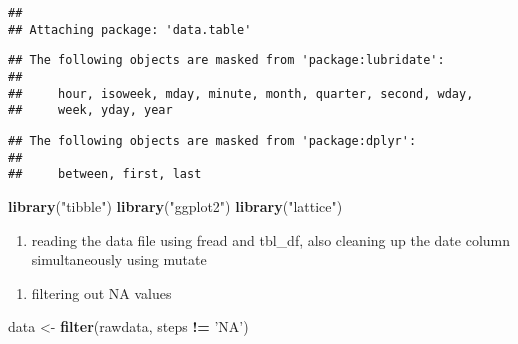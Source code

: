 \documentclass[]{article}
\newenvironment{Shaded}{\begin{snugshade}}{\end{snugshade}}
\newcommand{\KeywordTok}[1]{\textcolor[rgb]{0.13,0.29,0.53}{\textbf{#1}}}
\newcommand{\DataTypeTok}[1]{\textcolor[rgb]{0.13,0.29,0.53}{#1}}
\newcommand{\StringTok}[1]{\textcolor[rgb]{0.31,0.60,0.02}{#1}}
\newcommand{\OperatorTok}[1]{\textcolor[rgb]{0.81,0.36,0.00}{\textbf{#1}}}
\newcommand{\NormalTok}[1]{#1}
\providecommand{\tightlist}{%
  \setlength{\itemsep}{0pt}\setlength{\parskip}{0pt}}
\begin{document}
\begin{verbatim}
## 
## Attaching package: 'data.table'
\end{verbatim}

\begin{verbatim}
## The following objects are masked from 'package:lubridate':
## 
##     hour, isoweek, mday, minute, month, quarter, second, wday,
##     week, yday, year
\end{verbatim}

\begin{verbatim}
## The following objects are masked from 'package:dplyr':
## 
##     between, first, last
\end{verbatim}

\begin{Shaded}
\begin{Highlighting}[]
  \KeywordTok{library}\NormalTok{(}\StringTok{"tibble"}\NormalTok{)}
  \KeywordTok{library}\NormalTok{(}\StringTok{"ggplot2"}\NormalTok{)}
  \KeywordTok{library}\NormalTok{(}\StringTok{"lattice"}\NormalTok{)}
\end{Highlighting}
\end{Shaded}

\begin{enumerate}
\def\labelenumi{\arabic{enumi}.}
\tightlist
\item
  reading the data file using fread and tbl\_df, also cleaning up the
  date column simultaneously using mutate
\end{enumerate}

\begin{Shaded}
\end{Shaded}

\begin{enumerate}
\def\labelenumi{\arabic{enumi}.}
\setcounter{enumi}{1}
\tightlist
\item
  filtering out NA values
\end{enumerate}

\begin{Shaded}
\begin{Highlighting}[]
\NormalTok{    data <-}\StringTok{ }\KeywordTok{filter}\NormalTok{(rawdata, steps }\OperatorTok{!=}\StringTok{ 'NA'}\NormalTok{)}
\end{Highlighting}
\end{Shaded}
\end{document}

